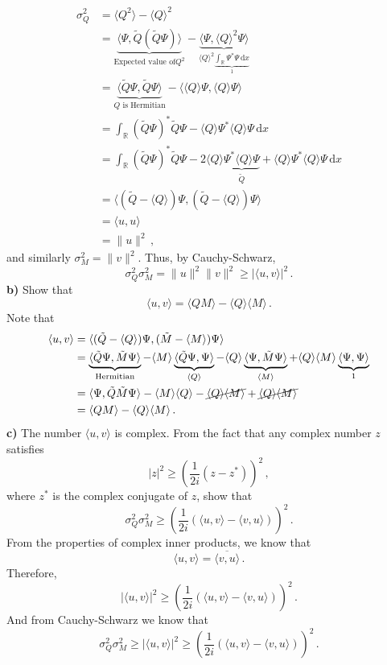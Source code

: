 \documentclass[letterpaper,10pt]{article}
\providecommand{\abs}[1]{\lvert#1\rvert}
\providecommand{\norm}[1]{\lVert#1\rVert}
\def\expect#1{\langle #1\rangle}
\def\d{\mathrm{d}}
\begin{document}
\begin{align*}
\sigma_Q^2&=\expect{Q^2}-\expect{Q}^2\\
&=\underbrace{\expect{\Psi,\tilde Q(\tilde Q\Psi)}}_{\text{Expected value of
}Q^2}-\underbrace{\expect{\Psi,\expect{Q}^2\Psi}}_
{\expect{Q}^2\underbrace{\int_{\mathbb{R}}\Psi^*\Psi\,\d x}_1}\\
&=\underbrace{\expect{\tilde Q\Psi,\tilde Q\Psi}}_{Q\text{ is Hermitian}}
-\expect{\expect{Q}\Psi,\expect{Q}\Psi}\\
&=\int_\mathbb{R}(\tilde Q\Psi)^*\tilde Q\Psi
-\expect{Q}\Psi^*\expect{Q}\Psi\,\d x\\
&=\int_\mathbb{R}(\tilde Q\Psi)^*\tilde Q\Psi
-2\expect{Q}\underbrace{\Psi^*\expect{Q}\Psi}_{\tilde Q}
+\expect{Q}\Psi^*\expect{Q}\Psi\,\d x\\
&=\expect{(\tilde Q-\expect{Q})\Psi,(\tilde Q-\expect{Q})\Psi}\\
&=\expect{u,u}\\
&=\norm{u}^2\,,
\end{align*}
and similarly $\sigma_M^2=\norm{v}^2$. Thus, by Cauchy-Schwarz,
\[
\sigma_Q^2\sigma_M^2=\norm{u}^2\norm{v}^2\geq\abs{\expect{u,v}}^2\,.
\]
\textbf{b)} Show that
\[
\expect{u,v}=\expect{QM}-\expect{Q}\expect{M}\,.
\]
Note that
\begin{align*}
\expect{u,v}&=\expect{(\tilde Q-\expect{Q})\Psi,(\tilde M-\expect{M})\Psi}\\
&=\underbrace{\expect{\tilde Q\Psi,\tilde M\Psi}}_{\text{Hermitian}}
-\expect{M}\underbrace{\expect{\tilde Q\Psi,\Psi}}_{\expect{Q}}
-\expect{Q}\underbrace{\expect{\Psi,\tilde M\Psi}}_{\expect{M}}
+\expect{Q}\expect{M}\underbrace{\expect{\Psi,\Psi}}_1\\
&=\expect{\Psi,\tilde Q\tilde M\Psi}
-\expect{M}\expect{Q}-\cancel{\expect{Q}\expect{M}}
+\cancel{\expect{Q}\expect{M}}\\
&=\expect{QM}-\expect{Q}\expect{M}\,.
\end{align*}
\textbf{c)} The number $\expect{u,v}$ is complex. From the fact that any
complex number $z$ satisfies
\[
\abs{z}^2\geq\left(\frac{1}{2i}(z-z^*)\right)^2\,,
\]
where $z^*$ is the complex conjugate of $z$, show that
\[
\sigma_Q^2\sigma_M^2\geq\left(\frac{1}{2i}(\expect{u,v}-\expect{v,u})\right)^2\,
.
\]
From the properties of complex inner products, we know that
\[
\expect{u,v}=\overline{\expect{v,u}}\,.
\]
Therefore,
\[
\abs{\expect{u,v}}^2\geq\left(\frac{1}{2i}(\expect{u,v}-\expect{v,u})\right)^2\,
.
\]
And from Cauchy-Schwarz we know that
\[
\sigma_Q^2\sigma_M^2\geq
\abs{\expect{u,v}}^2\geq
\left(\frac{1}{2i}(\expect{u,v}-\expect{v,u})\right)^2\,.
\]
\end{document}
